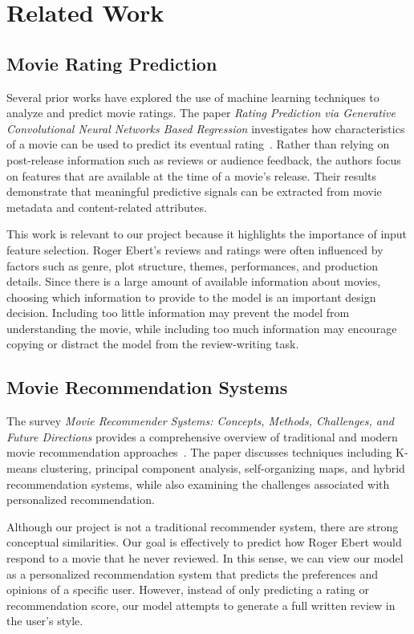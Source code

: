 \section{Related Work}

\subsection{Movie Rating Prediction}

Several prior works have explored the use of machine learning techniques to analyze and predict movie ratings. The paper \textit{Rating Prediction via Generative Convolutional Neural Networks Based Regression} investigates how characteristics of a movie can be used to predict its eventual rating~\cite{ratingprediction}. Rather than relying on post-release information such as reviews or audience feedback, the authors focus on features that are available at the time of a movie's release. Their results demonstrate that meaningful predictive signals can be extracted from movie metadata and content-related attributes.

This work is relevant to our project because it highlights the importance of input feature selection. Roger Ebert's reviews and ratings were often influenced by factors such as genre, plot structure, themes, performances, and production details. Since there is a large amount of available information about movies, choosing which information to provide to the model is an important design decision. Including too little information may prevent the model from understanding the movie, while including too much information may encourage copying or distract the model from the review-writing task.

\subsection{Movie Recommendation Systems}

The survey \textit{Movie Recommender Systems: Concepts, Methods, Challenges, and Future Directions} provides a comprehensive overview of traditional and modern movie recommendation approaches~\cite{recsurvey}. The paper discusses techniques including K-means clustering, principal component analysis, self-organizing maps, and hybrid recommendation systems, while also examining the challenges associated with personalized recommendation.

Although our project is not a traditional recommender system, there are strong conceptual similarities. Our goal is effectively to predict how Roger Ebert would respond to a movie that he never reviewed. In this sense, we can view our model as a personalized recommendation system that predicts the preferences and opinions of a specific user. However, instead of only predicting a rating or recommendation score, our model attempts to generate a full written review in the user's style.

